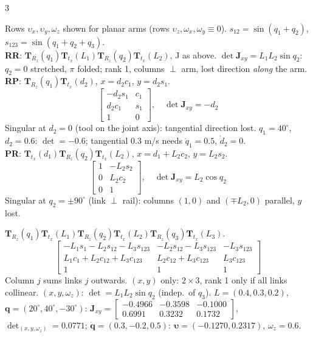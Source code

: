 \begin{multicols}{3}
\begin{fbx}
Rows $\upsilon_x,\upsilon_y,\omega_z$ shown for planar arms (rows $\upsilon_z,\omega_x,\omega_y\equiv0$). $s_{12}=\sin(q_1{+}q_2)$, $s_{123}=\sin(q_1{+}q_2{+}q_3)$.\\
\textbf{RR}: $\mathbf T_{R_z}(q_1)\mathbf T_{t_x}(L_1)\mathbf T_{R_z}(q_2)\mathbf T_{t_x}(L_2)$, J as above. $\det\mathbf J_{xy}=L_1L_2\sin q_2$: $q_2=0$ stretched, $\pi$ folded; rank 1, columns $\perp$ arm, lost direction \emph{along} the arm.\\
\textbf{RP}: $\mathbf T_{R_z}(q_1)\mathbf T_{t_x}(d_2)$, $x=d_2c_1$, $y=d_2s_1$.
\[\begin{bmatrix}-d_2s_1&c_1\\d_2c_1&s_1\\1&0\end{bmatrix},\quad\det\mathbf J_{xy}=-d_2\]
Singular at $d_2=0$ (tool on the joint axis): tangential direction lost. $q_1=40^\circ$, $d_2=0.6$: $\det=-0.6$; tangential $0.3$ m/s needs $\dot q_1=0.5$, $\dot d_2=0$.\\
\textbf{PR}: $\mathbf T_{t_x}(d_1)\mathbf T_{R_z}(q_2)\mathbf T_{t_x}(L_2)$, $x=d_1+L_2c_2$, $y=L_2s_2$.
\[\begin{bmatrix}1&-L_2s_2\\0&L_2c_2\\0&1\end{bmatrix},\quad\det\mathbf J_{xy}=L_2\cos q_2\]
Singular at $q_2=\pm90^\circ$ (link $\perp$ rail): columns $(1,0)$ and $(\mp L_2,0)$ parallel, $y$ lost.\\
\end{fbx}
\begin{fbx}
$\mathbf T_{R_z}(q_1)\mathbf T_{t_x}(L_1)\mathbf T_{R_z}(q_2)\mathbf T_{t_x}(L_2)\mathbf T_{R_z}(q_3)\mathbf T_{t_x}(L_3)$.
\[\begin{bmatrix}-L_1s_1-L_2s_{12}-L_3s_{123}&-L_2s_{12}-L_3s_{123}&-L_3s_{123}\\L_1c_1+L_2c_{12}+L_3c_{123}&L_2c_{12}+L_3c_{123}&L_3c_{123}\\1&1&1\end{bmatrix}\]
Column $j$ sums links $j$ outwards. $(x,y)$ only: $2\times3$, rank 1 only if all links collinear. $(x,y,\omega_z)$: $\det=L_1L_2\sin q_2$ (indep.\ of $q_3$). $L=(0.4,0.3,0.2)$, $\mathbf q=(20^\circ,40^\circ,-30^\circ)$: $\mathbf J_{xy}=\begin{bmatrix}-0.4966&-0.3598&-0.1000\\0.6991&0.3232&0.1732\end{bmatrix}$, $\det_{(x,y,\omega_z)}=0.0771$; $\dot{\mathbf q}=(0.3,-0.2,0.5)$: $\boldsymbol\upsilon=(-0.1270,0.2317)$, $\omega_z=0.6$.\\

\end{fbx}
\end{multicols}
